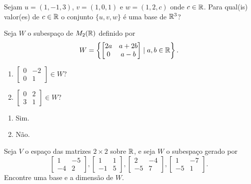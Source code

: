 \documentclass[12pt]{exam}
\begin{document}
\begin{exercicio}
	Sejam $u = (1, -1 , 3)$, $v = (1, 0 , 1)$ e $w = (1, 2 , c)$ onde $c \in \mathbb{R}$. Para qual(is) valor(es) de $c \in \mathbb{R}$ o conjunto $\{u, v, w\}$ \'e uma base de $\mathbb{R}^3$?
\end{exercicio}

\begin{exercicio}
	Seja $W$ o subespa\c{c}o de $M_2(\mathbb{R})$ definido por
	\[
	W = \left\{\begin{bmatrix}2a & a + 2b\\0 & a - b\end{bmatrix} \mid a, b \in \mathbb{R}\right\}.
	\]
	\begin{enumerate}[label={\alph*})]
		\item $\begin{bmatrix}0 & -2\\0 & 1\end{bmatrix} \in W$?
		\item $\begin{bmatrix}0 & 2\\3 & 1\end{bmatrix} \in W$?
	\end{enumerate}
	\begin{solucao}
		\begin{enumerate}[label={\alph*})]
			\item Sim.
			\item N\~ao.
		\end{enumerate}
	\end{solucao}
\end{exercicio}

\begin{exercicio}
	Seja $V$ o espa\c{c}o das matrizes $2 \times 2$ sobre $\mathbb{R}$, e seja $W$ o subespa\c{c}o gerado por
	\[
	\begin{bmatrix}
		1 & -5\\
		-4 & 2
	\end{bmatrix},
	\begin{bmatrix}
		1 & 1\\
		-1 & 5
	\end{bmatrix},
	\begin{bmatrix}
		2 & -4\\
		-5 & 7
	\end{bmatrix},
	\begin{bmatrix}
		1 & -7\\
		-5 & 1
	\end{bmatrix}.
	\]
	Encontre uma base e a dimens\~ao de $W$.
\end{exercicio}
\end{document}
